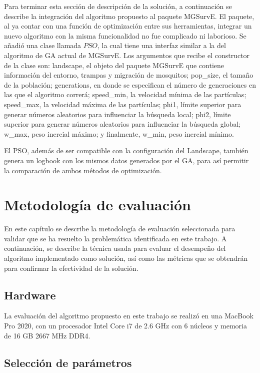 \documentclass[letterpaper]{report}
\begin{document}
    Para terminar esta sección de descripción de la solución, a continuación se
    describe la integración del algoritmo propuesto al paquete MGSurvE. El
    paquete, al ya contar con una función de optimización entre sus
    herramientas, integrar un nuevo algoritmo con la misma funcionalidad no fue
    complicado ni laborioso. Se añadió una clase llamada $PSO$, la cual tiene
    una interfaz similar a la del algoritmo de GA actual de MGSurvE. Los
    argumentos que recibe el constructor de la clase son: landscape, el objeto
    del paquete MGSurvE que contiene información del entorno, trampas y
    migración de mosquitos; pop\_size, el tamaño de la población; generations,
    en donde se especifican el número de generaciones en las que el algoritmo
    correrá; speed\_min, la velocidad mínima de las partículas; speed\_max, la
    velocidad máxima de las partículas; phi1, límite superior para generar
    números aleatorios para influenciar la búsqueda local; phi2, límite superior
    para generar números aleatorios para influenciar la búsqueda global; w\_max,
    peso inercial máximo; y finalmente, w\_min, peso inercial mínimo.
    
    El PSO, además de ser compatible con la configuración del Landscape, también
    genera un logbook con los mismos datos generados por el GA, para así
    permitir la comparación de ambos métodos de optimización. 

\chapter{Metodología de evaluación}\label{chap:metolodogia}

  En este capítulo se describe la metodología de evaluación seleccionada para
  validar que se ha resuelto la problemática identificada en este trabajo. A
  continuación, se describe la técnica usada para evaluar el desempeño del
  algoritmo implementado como solución, así como las métricas que se obtendrán
  para confirmar la efectividad de la solución.

  \section{Hardware}\label{sect:hardware}

    La evaluación del algoritmo propuesto en este trabajo se realizó en una
    MacBook Pro 2020, con un procesador Intel Core i7 de 2.6 GHz con 6 núcleos y
    memoria de 16 GB 2667 MHz DDR4.

  \section{Selección de parámetros}
\end{document}
